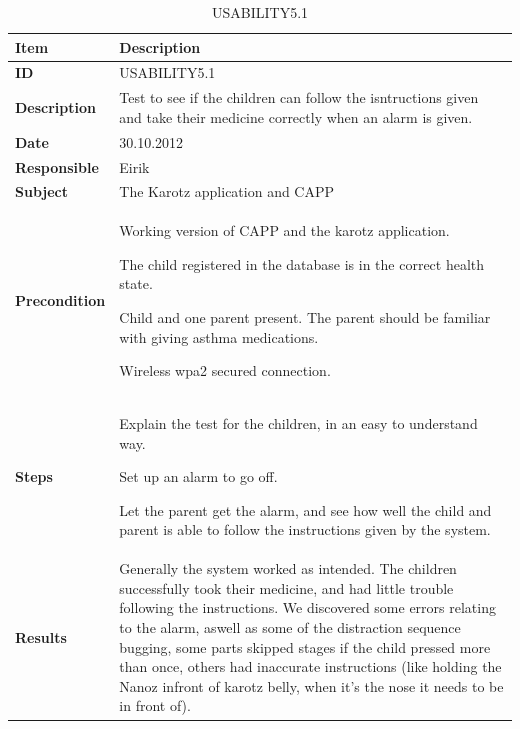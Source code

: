 \begin{table}
	\begin{center}
		\begin{tabular}{|p{3.0cm}|p{14.0cm}|}
			\hline
			\bf{Item} & \bf{Description}\\
			\hline
			\bf{ID} & USABILITY5.1\\
			\bf{Description} & Test to see if the children can follow the isntructions given and take their medicine correctly when an alarm is given.\\
			\bf{Date} & 30.10.2012\\
			\bf{Responsible} & Eirik\\
			\bf{Subject} & The Karotz application and CAPP\\
			\bf{Precondition} & 
				\begin{tabulitem}
					\item Working version of CAPP and the karotz application.
					\item The child registered in the database is in the correct health state.
					\item Child and one parent present. The parent should be familiar with giving asthma medications.
					\item Wireless wpa2 secured connection.
				\end{tabulitem}\\
			\bf{Steps} &
			\begin{tabulenum}
				\item Explain the test for the children, in an easy to understand way.
				\item Set up an alarm to go off.
				\item Let the parent get the alarm, and see how well the child and parent is able to follow the instructions given by the system.
			\end{tabulenum}\\
			\hline
			\bf{Results} & Generally the system worked as intended. The children successfully took their medicine, and had little trouble following the instructions.
							We discovered some errors relating to the alarm, aswell as some of the distraction sequence bugging, some parts skipped stages if the child
							pressed more than once, others had inaccurate instructions (like holding the Nanoz infront of karotz belly, when it's the nose it needs to be
							in front of).\\
			\hline
		\end{tabular}
	\end{center}
	\caption{USABILITY5.1}
	\label{tab:usability5.1}
\end{table}

